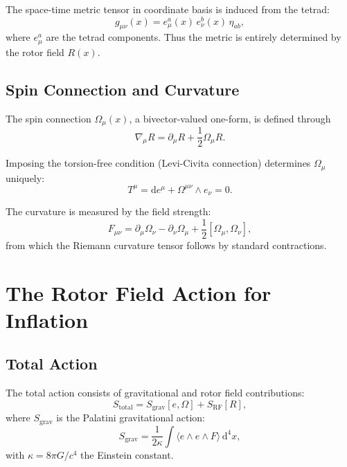 \documentclass[11pt,a4paper]{article}
\numberwithin{equation}{section}
\theoremstyle{plain}
\theoremstyle{definition}
\theoremstyle{remark}
\newcommand{\dd}{\mathrm{d}}
\begin{document}
The space-time metric tensor in coordinate basis is induced from the tetrad:
\begin{equation}
g_{\mu\nu}(x) = e_\mu^a(x)\, e_\nu^b(x)\, \eta_{ab},
\label{eq:metric}
\end{equation}
where $e_\mu^a$ are the tetrad components. Thus the metric is entirely determined by the rotor field $R(x)$.

\subsection{Spin Connection and Curvature}

The spin connection $\Omega_\mu(x)$, a bivector-valued one-form, is defined through
\begin{equation}
\nabla_\mu R = \partial_\mu R + \frac{1}{2}\Omega_\mu R.
\label{eq:covariant-deriv}
\end{equation}

Imposing the torsion-free condition (Levi-Civita connection) determines $\Omega_\mu$ uniquely:
\begin{equation}
T^\mu = \dd e^\mu + \Omega^{\mu\nu} \wedge e_\nu = 0.
\end{equation}

The curvature is measured by the field strength:
\begin{equation}
F_{\mu\nu} = \partial_\mu \Omega_\nu - \partial_\nu \Omega_\mu + \frac{1}{2}[\Omega_\mu, \Omega_\nu],
\label{eq:curvature}
\end{equation}
from which the Riemann curvature tensor follows by standard contractions.

\section{The Rotor Field Action for Inflation}
\label{sec:action}

\subsection{Total Action}

The total action consists of gravitational and rotor field contributions:
\begin{equation}
S_{\mathrm{total}} = S_{\mathrm{grav}}[e,\Omega] + S_{\mathrm{RF}}[R],
\label{eq:total-action}
\end{equation}
where $S_{\mathrm{grav}}$ is the Palatini gravitational action:
\begin{equation}
S_{\mathrm{grav}} = \frac{1}{2\kappa} \int \langle e \wedge e \wedge F \rangle\, \dd^4x,
\end{equation}
with $\kappa = 8\pi G/c^4$ the Einstein constant.
\end{document}

